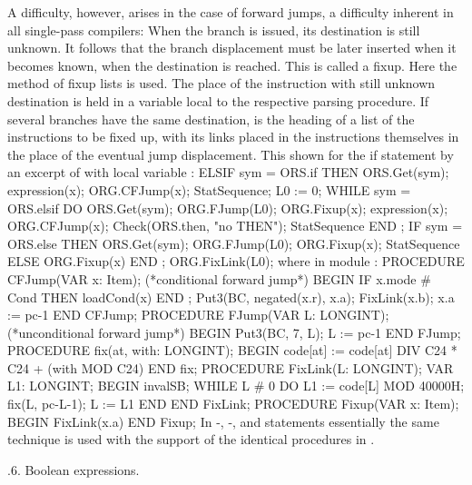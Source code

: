 A difficulty, however, arises in the case of forward jumps, a difficulty inherent in all single-pass compilers: When the branch is issued, its destination is still unknown. It follows that the branch displacement must be later inserted when it becomes known, when the destination is reached. This is called a fixup. Here the method of fixup lists is used. The place of the instruction with still unknown destination is held in a variable  local to the respective parsing procedure. If several branches have the same destination,  is the heading of a list of the instructions to be fixed up, with its links placed in the instructions themselves in the place of the eventual jump displacement. This shown for the if statement by an excerpt of  with local variable :
\begintt
ELSIF sym = ORS.if THEN
ORS.Get(sym); expression(x); ORG.CFJump(x); StatSequence; L0 := 0;
WHILE sym = ORS.elsif DO
ORS.Get(sym); ORG.FJump(L0); ORG.Fixup(x); expression(x);
ORG.CFJump(x); Check(ORS.then, "no THEN"); StatSequence END ;
IF sym = ORS.else THEN ORS.Get(sym); ORG.FJump(L0); ORG.Fixup(x); StatSequence ELSE ORG.Fixup(x)
END ;
ORG.FixLink(L0);
\endtt
\noindent where in module :
\begintt
PROCEDURE CFJump(VAR x: Item); (*conditional forward jump*) BEGIN
IF x.mode # Cond THEN loadCond(x) END ;
Put3(BC, negated(x.r), x.a); FixLink(x.b); x.a := pc-1 END CFJump;
PROCEDURE FJump(VAR L: LONGINT); (*unconditional forward jump*) BEGIN Put3(BC, 7, L); L := pc-1
END FJump;
PROCEDURE fix(at, with: LONGINT);
BEGIN code[at] := code[at] DIV C24 * C24 + (with MOD C24) END fix;
PROCEDURE FixLink(L: LONGINT); VAR L1: LONGINT;
BEGIN invalSB;
WHILE L # 0 DO L1 := code[L] MOD 40000H; fix(L, pc-L-1); L := L1 END
END FixLink;
PROCEDURE Fixup(VAR x: Item); BEGIN FixLink(x.a)
END Fixup;
\endtt
\noindent In -, -, and  statements essentially the same technique is used with the support of the identical procedures in .

.6. Boolean expressions.

